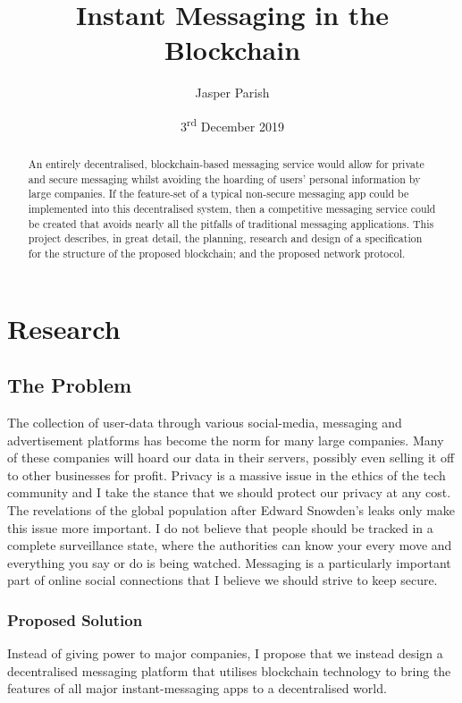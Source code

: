 \documentclass{article}
\title{Instant Messaging in the Blockchain}
\author{Jasper Parish}
\date{3\textsuperscript{rd} December 2019}
\begin{document}
\maketitle
\begin{abstract}
    An entirely decentralised, blockchain-based messaging service would allow for private and secure messaging whilst avoiding the hoarding of users' personal information by large companies. If the feature-set of a typical non-secure messaging app could be implemented into this decentralised system, then a competitive messaging service could be created that avoids nearly all the pitfalls of traditional messaging applications. This project describes, in great detail, the planning, research and design of a specification for the structure of the proposed blockchain; and the proposed network protocol.
\end{abstract}

\newpage
\tableofcontents
\newpage

\section{Research}
\subsection{The Problem}
The collection of user-data through various social-media, messaging and advertisement platforms has become the norm for many large companies. Many of these companies will hoard our data in their servers, possibly even selling it off to other businesses for profit. Privacy is a massive issue in the ethics of the tech community and I take the stance that we should protect our privacy at any cost. The revelations of the global population after Edward Snowden's leaks only make this issue more important. I do not believe that people should be tracked in a complete surveillance state, where the authorities can know your every move and everything you say or do is being watched. Messaging is a particularly important part of online social connections that I believe we should strive to keep secure.

\subsubsection{Proposed Solution}
Instead of giving power to major companies, I propose that we instead design a decentralised messaging platform that utilises blockchain technology to bring the features of all major instant-messaging apps to a decentralised world.
\end{document}
